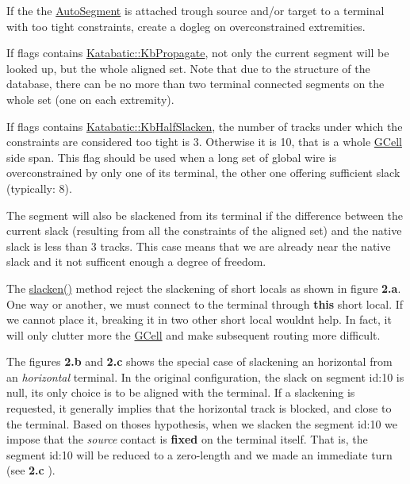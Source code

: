 If the the \mbox{\hyperlink{classKatabatic_1_1AutoSegment}{Auto\+Segment}} is attached trough source and/or target to a terminal with too tight constraints, create a dogleg on overconstrained extremities.

If {\ttfamily flags} contains \mbox{\hyperlink{namespaceKatabatic_a2af2ad6b6441614038caf59d04b3b217a3f95c1f06fe0b58b44ccbc57d99f2a5d}{Katabatic\+::\+Kb\+Propagate}}, not only the current segment will be looked up, but the whole aligned set. Note that due to the structure of the database, there can be no more than two terminal connected segments on the whole set (one on each extremity).

If {\ttfamily flags} contains \mbox{\hyperlink{namespaceKatabatic_a2af2ad6b6441614038caf59d04b3b217a1d6ccf82d04758a0922270d4f469066a}{Katabatic\+::\+Kb\+Half\+Slacken}}, the number of tracks under which the constraints are considered too tight is 3. Otherwise it is 10, that is a whole \mbox{\hyperlink{classKatabatic_1_1GCell}{G\+Cell}} side span. This flag should be used when a long set of global wire is overconstrained by only one of it\textquotesingle{}s terminal, the other one offering sufficient slack (typically\+: 8).

The segment will also be slackened from it\textquotesingle{}s terminal if the difference between the current slack (resulting from all the constraints of the aligned set) and the native slack is less than 3 tracks. This case means that we are already near the native slack and it not sufficent enough a degree of freedom.

 The {\ttfamily \mbox{\hyperlink{classKatabatic_1_1AutoSegment_a1fbc0adb4c0b14632edc7c55f028cd4b}{slacken()}}} method reject the slackening of short locals as shown in figure {\bfseries 2.\+a}. One way or another, we must connect to the terminal through {\bfseries this} short local. If we cannot place it, breaking it in two other short local wouldn\textquotesingle{}t help. In fact, it will only clutter more the \mbox{\hyperlink{classKatabatic_1_1GCell}{G\+Cell}} and make subsequent routing more difficult.

The figures {\bfseries 2.\+b} and {\bfseries 2.\+c} shows the special case of slackening an horizontal from an {\itshape horizontal} terminal. In the original configuration, the slack on segment {\ttfamily id\+:10} is null, it\textquotesingle{}s only choice is to be aligned with the terminal. If a slackening is requested, it generally implies that the horizontal track is blocked, and close to the terminal. Based on thoses hypothesis, when we slacken the segment {\ttfamily id\+:10} we impose that the {\itshape source} contact is {\bfseries fixed} on the terminal itself. That is, the segment {\ttfamily id\+:10} will be reduced to a zero-\/length and we made an immediate turn (see {\bfseries 2.\+c} ).

